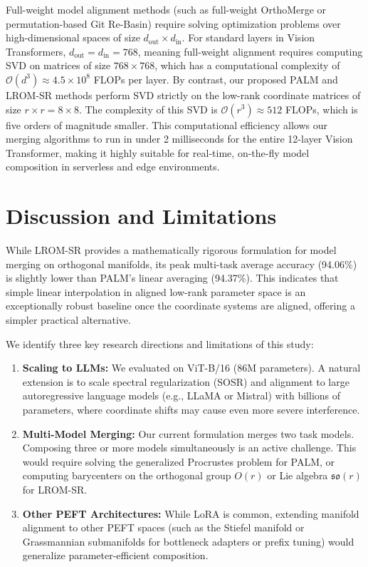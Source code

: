 \documentclass{article}
\theoremstyle{plain}
\theoremstyle{definition}
\theoremstyle{remark}
\begin{document}
Full-weight model alignment methods (such as full-weight OrthoMerge or permutation-based Git Re-Basin) require solving optimization problems over high-dimensional spaces of size $d_{\text{out}} \times d_{\text{in}}$. For standard layers in Vision Transformers, $d_{\text{out}} = d_{\text{in}} = 768$, meaning full-weight alignment requires computing SVD on matrices of size $768 \times 768$, which has a computational complexity of $\mathcal{O}(d^3) \approx 4.5 \times 10^8$ FLOPs per layer. By contrast, our proposed PALM and LROM-SR methods perform SVD strictly on the low-rank coordinate matrices of size $r \times r = 8 \times 8$. The complexity of this SVD is $\mathcal{O}(r^3) \approx 512$ FLOPs, which is five orders of magnitude smaller. This computational efficiency allows our merging algorithms to run in under 2 milliseconds for the entire 12-layer Vision Transformer, making it highly suitable for real-time, on-the-fly model composition in serverless and edge environments.
\section{Discussion and Limitations}
\label{sec:discussion}
While LROM-SR provides a mathematically rigorous formulation for model merging on orthogonal manifolds, its peak multi-task average accuracy (94.06\%) is slightly lower than PALM's linear averaging (94.37\%). This indicates that simple linear interpolation in aligned low-rank parameter space is an exceptionally robust baseline once the coordinate systems are aligned, offering a simpler practical alternative.

We identify three key research directions and limitations of this study:
\begin{enumerate}
    \item \textbf{Scaling to LLMs:} We evaluated on ViT-B/16 (86M parameters). A natural extension is to scale spectral regularization (SOSR) and alignment to large autoregressive language models (e.g., LLaMA or Mistral) with billions of parameters, where coordinate shifts may cause even more severe interference.
    \item \textbf{Multi-Model Merging:} Our current formulation merges two task models. Composing three or more models simultaneously is an active challenge. This would require solving the generalized Procrustes problem for PALM, or computing barycenters on the orthogonal group $O(r)$ or Lie algebra $\mathfrak{so}(r)$ for LROM-SR.
    \item \textbf{Other PEFT Architectures:} While LoRA is common, extending manifold alignment to other PEFT spaces (such as the Stiefel manifold or Grassmannian submanifolds for bottleneck adapters or prefix tuning) would generalize parameter-efficient composition.
\end{enumerate}
\end{document}
